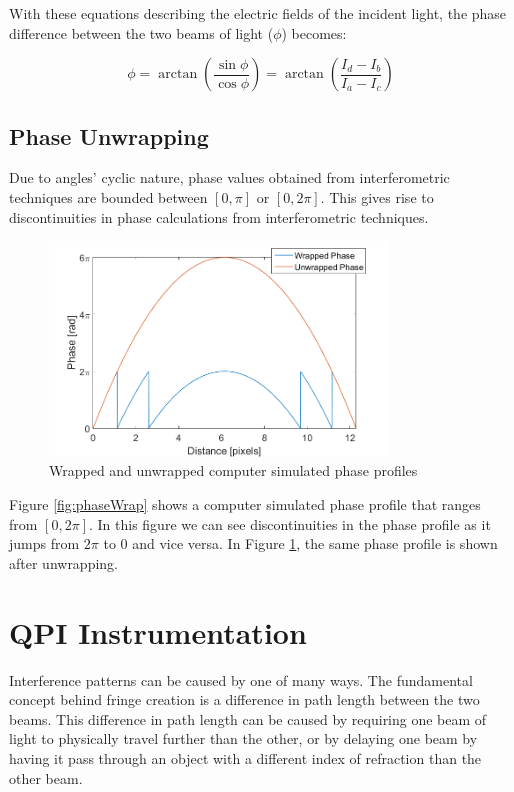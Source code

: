 \documentclass[10pt,letterpaper]{article}
\begin{document}
 With these equations describing the electric fields of the incident light, the phase difference between the two beams of light ($\phi$) becomes:
 
 \begin{equation}
\phi=\arctan\left(\frac{\sin\phi}{\cos\phi}\right)=\arctan\left(\frac{I_d-I_b}{I_a-I_c}\right) 
\end{equation}

\subsection{Phase Unwrapping}

Due to angles' cyclic nature, phase values obtained from interferometric techniques are bounded between $[0,\pi]$ or $[0,2\pi]$. This gives rise to discontinuities in phase calculations from interferometric techniques.

\begin{figure}
\centering
\includegraphics[width=0.8\textwidth]{phaseUnwrapped.png}
\caption{Wrapped and unwrapped computer simulated phase profiles}
\label{fig:phaseUN}
\end{figure}

Figure \ref{fig:phaseWrap} shows a computer simulated phase profile that ranges from $[0,2\pi]$. In this figure we can see discontinuities in the phase profile as it jumps from $2\pi$ to $0$ and vice versa. In Figure \ref{fig:phaseUN}, the same phase profile is shown after unwrapping.

\section{QPI Instrumentation}

 Interference patterns can be caused by one of many ways. The fundamental concept behind fringe creation is a difference in path length between the two beams. This difference in path length can be caused by requiring one beam of light to physically travel further than the other, or by delaying one beam by having it pass through an object with a different index of refraction than the other beam.
 
\end{document}
